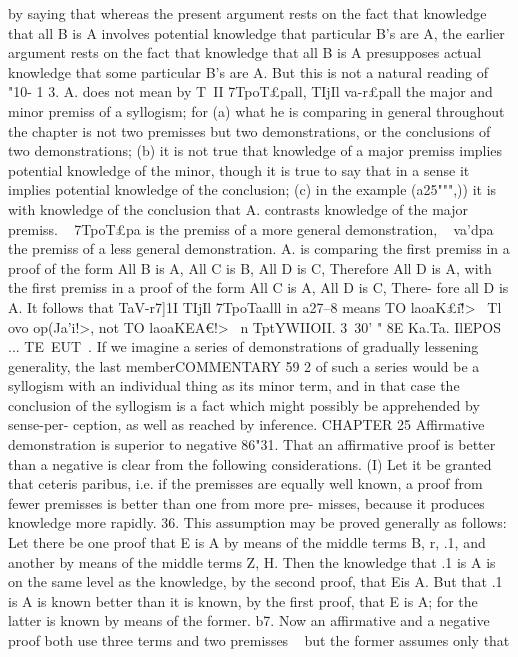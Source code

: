 {{{{{{{{{{{{{{{{{{{{{{{{{{{{{{{{{{by saying that whereas the present argument rests on the fact
that knowledge that all B is A involves potential knowledge that
particular B's are A, the earlier argument rests on the fact
that knowledge that all B is A presupposes actual knowledge that
some particular B's are A. But this is not a natural reading of
"10- 1 3.
A. does not mean by T~II 7TpoT£pall, TIjIl va-r£pall the major and
minor premiss of a syllogism; for (a) what he is comparing in
general throughout the chapter is not two premisses but two
demonstrations, or the conclusions of two demonstrations; (b)
it is not true that knowledge of a major premiss implies potential
knowledge of the minor, though it is true to say that in a sense
it implies potential knowledge of the conclusion; (c) in the example
(a25""",)) it is with knowledge of the conclusion that A. contrasts
knowledge of the major premiss. ~ 7TpoT£pa is the premiss of a
more general demonstration, ~ va'dpa the premiss of a less general
demonstration. A. is comparing the first premiss in a proof of the
form All B is A, All C is B, All D is C, Therefore All D is A, with
the first premiss in a proof of the form All C is A, All D is C, There-
fore all D is A.
It follows that TaV-r7]1I TIjIl 7TpoTaalll in a27--8 means TO laoaK£i\~!>
~Tl ovo op(Ja'i!>, not TO laoaKEA€!> ~n TptYWIIOII.
3~30' " 8E Ka.Ta. IlEPOS ... TE~EUT~. If we imagine a series of
demonstrations of gradually lessening generality, the last memberCOMMENTARY
59 2
of such a series would be a syllogism with an individual thing
as its minor term, and in that case the conclusion of the syllogism
is a fact which might possibly be apprehended by sense-per-
ception, as well as reached by inference.
CHAPTER 25
Affirmative demonstration is superior to negative
86"31. That an affirmative proof is better than a negative
is clear from the following considerations. (I) Let it be granted
that ceteris paribus, i.e. if the premisses are equally well known,
a proof from fewer premisses is better than one from more pre-
misses, because it produces knowledge more rapidly.
36. This assumption may be proved generally as follows: Let
there be one proof that E is A by means of the middle terms
B, r, .1, and another by means of the middle terms Z, H. Then
the knowledge that .1 is A is on the same level as the knowledge,
by the second proof, that Eis A. But that .1 is A is known better
than it is known, by the first proof, that E is A; for the latter
is known by means of the former.
b7. Now an affirmative and a negative proof both use three
terms and two premisses ~ but the former assumes only that
}}}}}}}}}}}}}}}}}}}}}}}}}}}}}}}}}}
